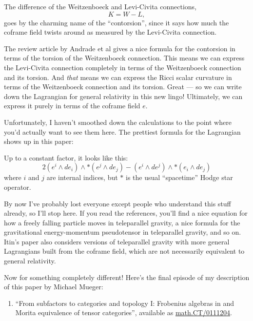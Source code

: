 \documentclass{article}
\def\tightlist{}
\renewcommand{\texttt}[1]{%
  \begingroup
  \ttfamily
  \begingroup\lccode`~=`/\lowercase{\endgroup\def~}{/\discretionary{}{}{}}%
  \begingroup\lccode`~=`[\lowercase{\endgroup\def~}{[\discretionary{}{}{}}%
  \begingroup\lccode`~=`.\lowercase{\endgroup\def~}{.\discretionary{}{}{}}%
  \catcode`/=\active\catcode`[=\active\catcode`.=\active
  \scantokens{#1\noexpand}%
  \endgroup
}
\begin{document}
The difference of the Weitzenboeck and Levi-Civita connections,
\[K = W - L,\] goes by the charming name of the ``contorsion'', since it
says how much the coframe field twists around as measured by the
Levi-Civita connection.

The review article by Andrade et al gives a nice formula for the
contorsion in terms of the torsion of the Weitzenboeck connection. This
means we can express the Levi-Civita connection completely in terms of
the Weitzenboeck connection and its torsion. And \emph{that} means we
can express the Ricci scalar curvature in terms of the Weitzenboeck
connection and its torsion. Great --- so we can write down the
Lagrangian for general relativity in this new lingo! Ultimately, we can
express it purely in terms of the coframe field \(e\).

Unfortunately, I haven't smoothed down the calculations to the point
where you'd actually want to see them here. The prettiest formula for
the Lagrangian shows up in this paper:


Up to a constant factor, it looks like this:
\[2(e^i\wedge de_i)\wedge *(e^j\wedge de_j) - (e^i\wedge de^j)\wedge *(e_i\wedge de_j)\]
where \(i\) and \(j\) are internal indices, but \(*\) is the usual
``spacetime'' Hodge star operator.

By now I've probably lost everyone except people who understand this
stuff already, so I'll stop here. If you read the references, you'll
find a nice equation for how a freely falling particle moves in
teleparallel gravity, a nice formula for the gravitational
energy-momentum pseudotensor in teleparallel gravity, and so on. Itin's
paper also considers versions of teleparallel gravity with more general
Lagrangians built from the coframe field, which are not necessarily
equivalent to general relativity.

Now for something completely different! Here's the final episode of my
description of this paper by Michael Mueger:

\begin{enumerate}
\def\labelenumi{\arabic{enumi})}
\setcounter{enumi}{14}
\tightlist
\item
  ``From subfactors to categories and topology I: Frobenius algebras in
  and Morita equivalence of tensor categories'', available as
  \href{http://www.arXiv.org/abs/math.CT/0111204}{math.CT/0111204}.
\end{enumerate}
\end{document}
